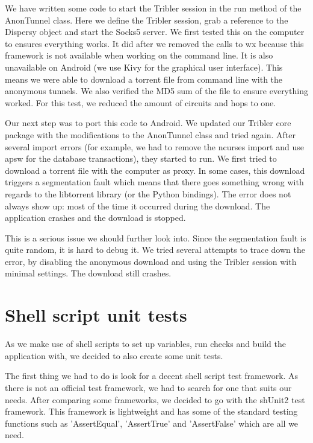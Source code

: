 	We have written some code to start the Tribler session in the run method of the AnonTunnel class. Here we define the Tribler session, grab a reference to the Dispersy object and start the Socks5 server. We first tested this on the computer to ensures everything works. It did after we removed the calls to wx because this framework is not available when working on the command line. It is also unavailable on Android (we use Kivy for the graphical user interface). This means we were able to download a torrent file from command line with the anonymous tunnels. We also verified the MD5 sum of the file to ensure everything worked. For this test, we reduced the amount of circuits and hops to one.
	
	Our next step was to port this code to Android. We updated our Tribler core package with the modifications to the AnonTunnel class and tried again. After several import errors (for example, we had to remove the ncurses import and use apsw for the database transactions), they started to run. We first tried to download a torrent file with the computer as proxy. In some cases, this download triggers a segmentation fault which means that there goes something wrong with regards to the libtorrent library (or the Python bindings). The error does not always show up: most of the time it occurred during the download. The application crashes and the download is stopped.
	
	This is a serious issue we should further look into. Since the segmentation fault is quite random, it is hard to debug it. We tried several attempts to trace down the error, by disabling the anonymous download and using the Tribler session with minimal settings. The download still crashes.

	\section{Shell script unit tests}
		As we make use of shell scripts to set up variables, run checks and build the application with, we decided to also create some unit tests.
		
		The first thing we had to do is look for a decent shell script test framework. As there is not an official test framework, we had to search for one that suits our needs. After comparing some frameworks, we decided to go with the shUnit2 test framework. This framework is lightweight and has some of the standard testing functions such as 'AssertEqual', 'AssertTrue' and 'AssertFalse' which are all we need. 
		
